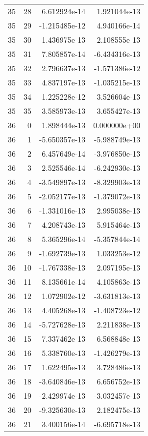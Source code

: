 \begin{tabular}{rrrr}
  35 &   28 &  6.612924e-14 &  1.921044e-13 \\
  35 &   29 & -1.215485e-12 &  4.940166e-14 \\
  35 &   30 &  1.436975e-13 &  2.108555e-13 \\
  35 &   31 &  7.805857e-14 & -6.434316e-13 \\
  35 &   32 &  2.796637e-13 & -1.571386e-12 \\
  35 &   33 &  4.837197e-13 & -1.035215e-13 \\
  35 &   34 &  1.225228e-12 &  3.526604e-13 \\
  35 &   35 &  3.585973e-13 &  3.655427e-13 \\
  36 &    0 &  1.898444e-13 &  0.000000e+00 \\
  36 &    1 & -5.650357e-13 & -5.988749e-13 \\
  36 &    2 &  6.457649e-14 & -3.976850e-13 \\
  36 &    3 &  2.525546e-14 & -6.242930e-13 \\
  36 &    4 & -3.549897e-13 & -8.329903e-13 \\
  36 &    5 & -2.052177e-13 & -1.379072e-13 \\
  36 &    6 & -1.331016e-13 &  2.995038e-13 \\
  36 &    7 &  4.208743e-13 &  5.915464e-13 \\
  36 &    8 &  5.365296e-14 & -5.357844e-14 \\
  36 &    9 & -1.692739e-13 &  1.033253e-12 \\
  36 &   10 & -1.767338e-13 &  2.097195e-13 \\
  36 &   11 &  8.135661e-14 &  4.105863e-13 \\
  36 &   12 &  1.072902e-12 & -3.631813e-13 \\
  36 &   13 &  4.405268e-13 & -1.408723e-12 \\
  36 &   14 & -5.727628e-13 &  2.211838e-13 \\
  36 &   15 &  7.337462e-13 &  6.568848e-13 \\
  36 &   16 &  5.338760e-13 & -1.426279e-13 \\
  36 &   17 &  1.622495e-13 &  3.728486e-13 \\
  36 &   18 & -3.640846e-13 &  6.656752e-13 \\
  36 &   19 & -2.429974e-13 & -3.032457e-13 \\
  36 &   20 & -9.325630e-13 &  2.182475e-13 \\
  36 &   21 &  3.400156e-14 & -6.695718e-13 \\

\end{tabular}
